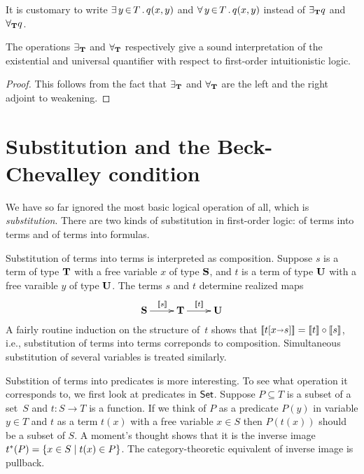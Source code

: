 It is customary to write $\exists\, y \,{\in}\, T\,.\,q(x,y)$ and
$\forall\, y \,{\in}\, T\,.\,q(x,y)$ instead of $\exists_{\mathbf{T}} q$ and
$\forall_{\mathbf{T}} q$.

\begin{proposition}
  The operations $\exists_{\mathbf{T}}$ and $\forall_{\mathbf{T}}$
  respectively give a sound interpretation of the existential and
  universal quantifier with respect to first-order intuitionistic
  logic.
\end{proposition}

\begin{proof}
  This follows from the fact that $\exists_{\mathbf{T}}$ and
  $\forall_{\mathbf{T}}$ are the left and the right adjoint to weakening.
\end{proof}

\section{Substitution and the Beck-Chevalley condition}
\label{sec:beck-chevalley}

We have so far ignored the most basic logical operation of all, which
is \emph{substitution}. There are two kinds of substitution in
first-order logic: of terms into terms and of terms into formulas.

Substitution of terms into terms is interpreted as composition.
Suppose $s$ is a term of type $\mathbf{T}$ with a free variable $x$ of
type $\mathbf{S}$, and $t$ is a term of type $\mathbf{U}$ with a free
varaible $y$ of type $\mathbf{U}$. The terms $s$ and $t$ determine
realized maps
%
\begin{equation*}
  \xymatrix{
    {\asm{S}}
    \ar[r]^{\sem{s}}
    &
    {\asm{T}}
    \ar[r]^{\sem{t}}
    &
    {\asm{U}}
  }
\end{equation*}
%
A fairly routine induction on the structure of~$t$ shows that
$[\![t[x {\shortrightarrow} s]]\!] = [\![t]\!] \circ [\![s]\!]$, i.e.,
substitution of terms into terms correponds to composition.
Simultaneous substitution of several variables is treated similarly.

Substition of terms into predicates is more interesting. To see what
operation it corresponds to, we first look at predicates in $\mathsf{Set}$.
Suppose $P \subseteq T$ is a subset of a set~$S$ and $t : S \to T$ is
a function. If we think of $P$ as a predicate $P(y)$ in variable $y
\in T$ and $t$ as a term $t(x)$ with a free variable $x \in S$ then
$P(t(x))$ should be a subset of $S$. A moment's thought shows that it
is the inverse image $t^{*}(P) = \{x \in S \mid t(x) \in P\}$.
The category-theoretic equivalent of inverse image is pullback.

